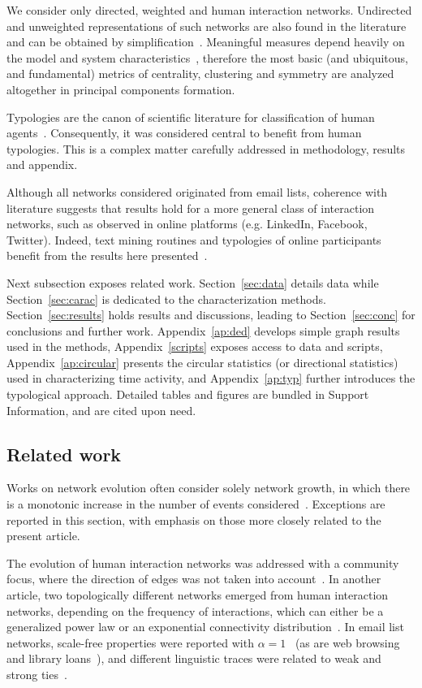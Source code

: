 \documentclass[%
 aip,
 jmp,%
 amsmath,amssymb,
 reprint,%
]{revtex4-1}
\begin{document}
We consider only directed, weighted and human interaction networks. Undirected and unweighted representations of such networks are also found in the literature and can be obtained by simplification~\cite{GMANE2}.
Meaningful measures depend heavily on the model and system characteristics~\cite{newmanStru, newmanWeight}, therefore the most basic (and ubiquitous, and fundamental) metrics of centrality, clustering and symmetry are analyzed altogether in principal components formation.

Typologies are the canon of scientific literature for classification of human agents~\cite{typCanon}. Consequently, it was considered central to benefit from human typologies. This is a complex matter carefully addressed in methodology, results and appendix.

Although all networks considered originated from email lists,
 coherence with literature suggests that results hold for a more general class of interaction networks,
 such as observed in online platforms (e.g. LinkedIn, Facebook, Twitter).
Indeed, text mining routines and typologies of online participants benefit from the results here presented~\cite{rcText,rcTipo}.

Next subsection exposes related work. Section~\ref{sec:data} details data while Section~\ref{sec:carac} is dedicated to the characterization methods. Section~\ref{sec:results} holds results and discussions, leading to Section~\ref{sec:conc} for conclusions and further work. Appendix~\ref{ap:ded} develops simple graph results used in the methods, Appendix~\ref{scripts} exposes access to data and scripts, Appendix~\ref{ap:circular} presents the circular statistics (or directional statistics) used in characterizing time activity, and Appendix~\ref{ap:typ} further introduces the typological approach. Detailed tables and figures are bundled in Support Information, and are cited upon need.

\subsection{Related work}\label{sec:related}
Works on network evolution often consider solely network growth, in which there is a monotonic increase in the number of events considered~\cite{barabasiEvo}. Exceptions are reported in this section, with emphasis on those more closely related to the present article.

The evolution of human interaction networks was addressed with a community focus, where the direction of edges was not taken into account~\cite{barabasiEvo}. In another article, two topologically different networks emerged from human interaction networks, depending on the frequency of interactions, which can either be a generalized power law or an exponential connectivity distribution~\cite{barabasiTopologicalEv}. In email list networks, scale-free properties were reported with $\alpha=1$~\cite{bird} (as are web browsing and library loans~\cite{barabasiHumanDyn}), and different linguistic traces were related to weak and strong ties~\cite{GMANE2}.
\end{document}
